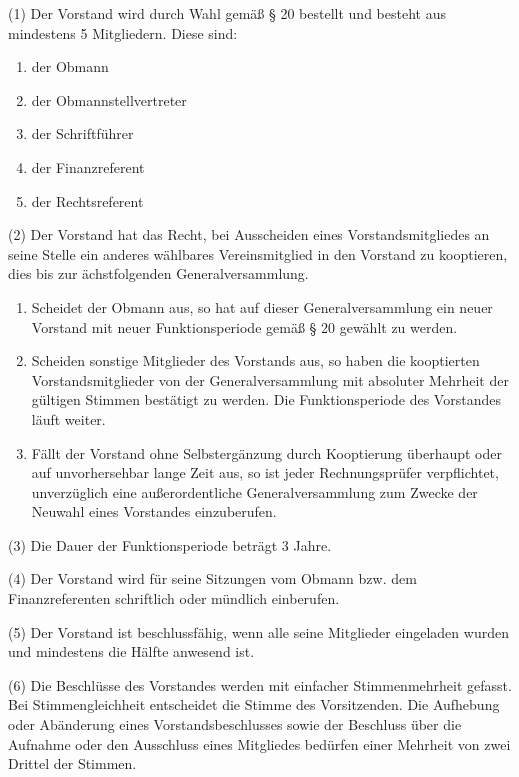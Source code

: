 \documentclass[10pt,a4paper]{article}
\begin{document}
(1)
Der Vorstand wird durch Wahl gemäß § 20 bestellt und besteht aus mindestens 5 Mitgliedern.
Diese sind:

\begin{enumerate}[label=\alph*)]
\item
der Obmann
\item
der Obmannstellvertreter
\item
der Schriftführer
\item
der Finanzreferent
\item
der Rechtsreferent
\end{enumerate}

(2)
Der Vorstand hat das Recht, bei Ausscheiden eines Vorstandsmitgliedes an seine Stelle ein anderes wählbares Vereinsmitglied in den Vorstand zu kooptieren, dies bis zur ächstfolgenden Generalversammlung.

\begin{enumerate}[label=\alph*)]
\item
Scheidet der Obmann aus, so hat auf dieser Generalversammlung ein neuer Vorstand mit neuer Funktionsperiode gemäß § 20 gewählt zu werden.
\item
Scheiden sonstige Mitglieder des Vorstands aus, so haben die kooptierten Vorstandsmitglieder von der Generalversammlung mit absoluter Mehrheit der gültigen Stimmen bestätigt zu werden.
Die Funktionsperiode des Vorstandes läuft weiter.
\item
Fällt der Vorstand ohne Selbstergänzung durch Kooptierung überhaupt oder auf unvorhersehbar lange Zeit aus, so ist jeder Rechnungsprüfer verpflichtet, unverzüglich eine außerordentliche Generalversammlung zum Zwecke der Neuwahl eines Vorstandes einzuberufen.
\end{enumerate}

(3)
Die Dauer der Funktionsperiode beträgt 3 Jahre.

(4)
Der Vorstand wird für seine Sitzungen vom Obmann bzw. dem Finanzreferenten schriftlich oder mündlich einberufen.

(5)
Der Vorstand ist beschlussfähig, wenn alle seine Mitglieder eingeladen wurden und mindestens die Hälfte anwesend ist.

(6)
Die Beschlüsse des Vorstandes werden mit einfacher Stimmenmehrheit gefasst.
Bei Stimmengleichheit entscheidet die Stimme des Vorsitzenden.
Die Aufhebung oder Abänderung eines Vorstandsbeschlusses sowie der Beschluss über die Aufnahme oder den Ausschluss eines Mitgliedes bedürfen einer Mehrheit von zwei Drittel der Stimmen.
\end{document}
